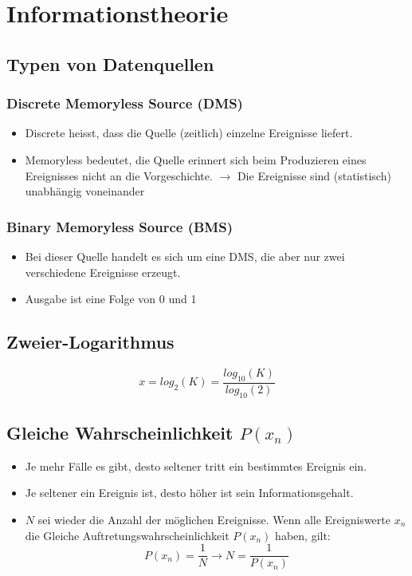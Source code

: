 \section{Informationstheorie}
\subsection{Typen von Datenquellen}
\subsubsection{Discrete Memoryless Source (DMS)}
\begin{itemize}
    \item Discrete heisst, dass die Quelle (zeitlich) einzelne Ereignisse liefert.
    \item Memoryless bedeutet, die Quelle erinnert sich beim Produzieren
    eines Ereignisses nicht an die Vorgeschichte.
    $\rightarrow$ Die Ereignisse sind (statistisch) unabhängig voneinander
\end{itemize}
\subsubsection{Binary Memoryless Source (BMS)}
\begin{itemize}
    \item Bei dieser Quelle handelt es sich um eine DMS, die aber nur zwei
    verschiedene Ereignisse erzeugt.
    \item Ausgabe ist eine Folge von 0 und 1
\end{itemize}
\subsection{Zweier-Logarithmus}
\begin{equation*}
    x = log_2(K) = \frac{log_{10}(K)}{log_{10}(2)}
\end{equation*}
\subsection{Gleiche Wahrscheinlichkeit $P(x_n)$}
\begin{itemize}
    \item Je mehr Fälle es gibt, desto seltener tritt ein bestimmtes Ereignis ein.
    \item Je seltener ein Ereignis ist, desto höher ist sein Informationsgehalt.
    \item $N$ sei wieder die Anzahl der möglichen Ereignisse. Wenn alle Ereigniswerte $x_n$ die Gleiche
    Auftretungswahrscheinlichkeit $P(x_n)$ haben, gilt:
    \begin{equation*}
        P(x_n) = \frac{1}{N} \rightarrow N = \frac{1}{P(x_n)}
    \end{equation*}
\end{itemize}
